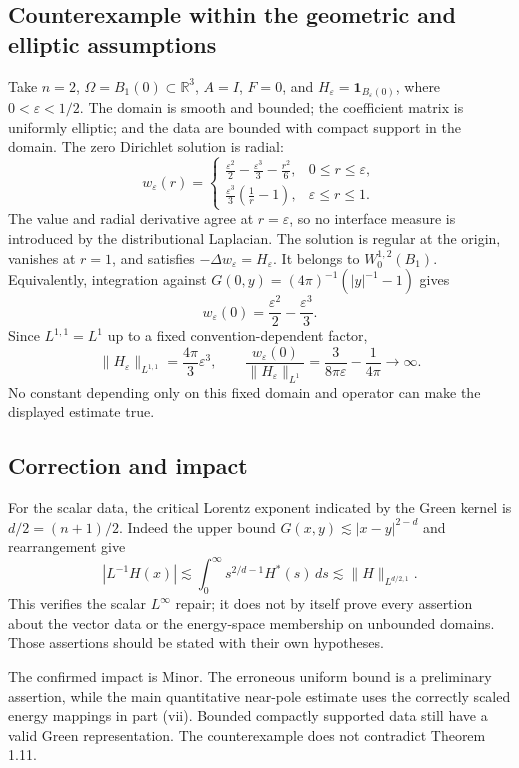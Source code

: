 \documentclass[10pt]{article}
\begin{document}
\subsection*{Counterexample within the geometric and elliptic assumptions}
Take \(n=2\), \(\Omega=B_1(0)\subset\mathbb R^3\), \(A=I\), \(F=0\), and \(H_\varepsilon=\mathbf1_{B_\varepsilon(0)}\), where \(0<\varepsilon<1/2\). The domain is smooth and bounded; the coefficient matrix is uniformly elliptic; and the data are bounded with compact support in the domain. The zero Dirichlet solution is radial: \[w_\varepsilon(r)=
 \begin{cases}
 \displaystyle \frac{\varepsilon^2}{2}
 -\frac{\varepsilon^3}{3}-\frac{r^2}{6},
       &0\leq r\leq\varepsilon,\\[4pt]
 \displaystyle \frac{\varepsilon^3}{3}\left(\frac1r-1\right),
       &\varepsilon\leq r\leq1.
 \end{cases}\] The value and radial derivative agree at \(r=\varepsilon\), so no interface measure is introduced by the distributional Laplacian. The solution is regular at the origin, vanishes at \(r=1\), and satisfies \(-\Delta w_\varepsilon=H_\varepsilon\). It belongs to \(W^{1,2}_0(B_1)\). Equivalently, integration against \(G(0,y)=(4\pi)^{-1}(|y|^{-1}-1)\) gives \[w_\varepsilon(0)=\frac{\varepsilon^2}{2}
                  -\frac{\varepsilon^3}{3}.\] Since \(L^{1,1}=L^1\) up to a fixed convention-dependent factor, \[\|H_\varepsilon\|_{L^{1,1}}
 =\frac{4\pi}{3}\varepsilon^3,\qquad
 \frac{w_\varepsilon(0)}{\|H_\varepsilon\|_{L^1}}
 =\frac{3}{8\pi\varepsilon}-\frac1{4\pi}\longrightarrow\infty.\] No constant depending only on this fixed domain and operator can make the displayed estimate true.\par
\subsection*{Correction and impact}
For the scalar data, the critical Lorentz exponent indicated by the Green kernel is \(d/2=(n+1)/2\). Indeed the upper bound \(G(x,y)\lesssim |x-y|^{2-d}\) and rearrangement give \[|L^{-1}H(x)|
 \lesssim \int_0^\infty s^{2/d-1}H^*(s)\,ds
 \lesssim \|H\|_{L^{d/2,1}}.\] This verifies the scalar \(L^\infty\) repair; it does not by itself prove every assertion about the vector data or the energy-space membership on unbounded domains. Those assertions should be stated with their own hypotheses.\par
The confirmed impact is Minor. The erroneous uniform bound is a preliminary assertion, while the main quantitative near-pole estimate uses the correctly scaled energy mappings in part (vii). Bounded compactly supported data still have a valid Green representation. The counterexample does not contradict Theorem 1.11.\par
\end{document}
